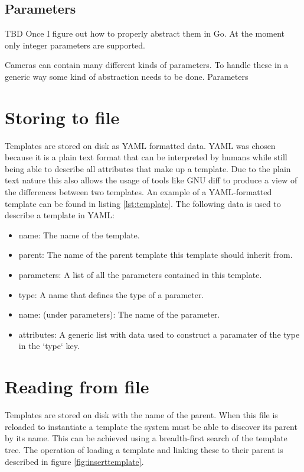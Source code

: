 \subsection{Parameters}
TBD Once I figure out how to properly abstract them in Go.
At the moment only integer parameters are supported.

Cameras can contain many different kinds of parameters. To handle these in a generic way some kind of abstraction needs to be done.
Parameters 

\section{Storing to file}
Templates are stored on disk as YAML formatted data. YAML was chosen because it is a plain text format that can be interpreted by humans while still being able to describe all attributes that make up a template. 
Due to the plain text nature this also allows the usage of tools like GNU diff to produce a view of the differences between two templates.
An example of a YAML-formatted template can be found in listing \ref{lst:template}.
The following data is used to describe a template in YAML:
\begin{itemize}
	\item name: The name of the template.
	\item parent: The name of the parent template this template should inherit from.
	\item parameters: A list of all the parameters contained in this template.
	\item type: A name that defines the type of a parameter.
	\item name: (under parameters): The name of the parameter.
	\item attributes: A generic list with data used to construct a paramater of the type in the `type` key.
\end{itemize}


\section{Reading from file}
Templates are stored on disk with the name of the parent. When this file is reloaded to instantiate a template the system must be able to discover its
parent by its name. This can be achieved using a breadth-first search of the template tree.
The operation of loading a template and linking these to their parent is described in figure \ref{fig:inserttemplate}.

